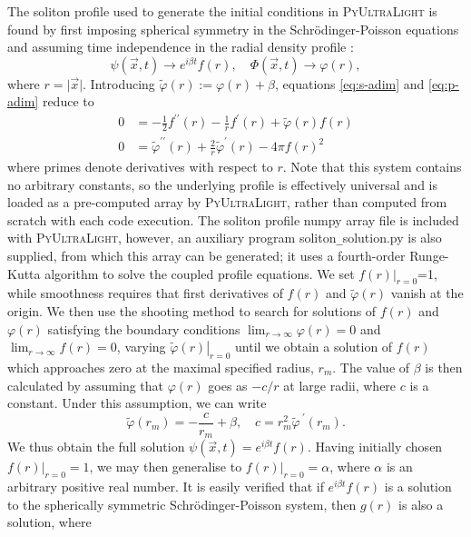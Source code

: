 \documentclass[a4paper,11pt]{article}
\newcommand{\PyUltraLight}{\textsc{PyUltraLight}\xspace}
\begin{document}
The soliton profile used to generate the initial conditions in \PyUltraLight is found by first imposing spherical symmetry in the Schr{\"o}dinger-Poisson equations and assuming time independence in the radial density profile \cite{Paredes:2015wga}:
%
\begin{equation}
    \psi(\vec{x},t)\rightarrow e^{i\beta t} f(r), \quad \Phi(\vec{x},t)\rightarrow \varphi(r),
\end{equation}
where $r=\vert\vec{x}\vert$. Introducing $\tilde{\varphi}(r):=\varphi(r)+\beta$, equations \ref{eq:s-adim} and \ref{eq:p-adim}  reduce to
\begin{align}
    0 &= -\frac{1}{2}f^{\prime\prime}(r)-\frac{1}{r}f^\prime(r)+\tilde{\varphi}(r)f(r)\label{eq:s-spherical}\\
    0 &= \tilde{\varphi}^{\prime\prime}(r)+\frac{2}{r}\tilde{\varphi}^\prime(r)-4\pi f(r)^2\label{eq:p-spherical}
\end{align}
%
where primes denote derivatives with respect to $r$. Note that this system contains no arbitrary constants, so the underlying profile is effectively universal and is loaded as a pre-computed array by \PyUltraLight, rather than computed from scratch with each code execution. The soliton profile numpy array file is included with \PyUltraLight, however, an auxiliary program {\sc soliton\texttt{\_}solution.py} is also supplied, from which this array can be generated; it uses a  fourth-order Runge-Kutta algorithm to solve the coupled profile equations. We set $\left. f(r) \right|_{r=0}$=1, while  smoothness requires that first derivatives of $f(r)$ and $\tilde{\varphi}(r)$ vanish at the origin. We then use the shooting method to search for solutions of $f(r)$ and $\varphi(r)$  satisfying the boundary conditions $\lim_{r\rightarrow\infty}\varphi(r)=0$ and $\lim_{r\rightarrow\infty}f(r)=0$, varying $\left. \tilde{\varphi}(r)\right|_{r=0}$ until we obtain a solution of $f(r)$ which approaches zero at the maximal specified radius, $r_m$. The value of $\beta$ is then calculated by assuming that $\varphi(r)$ goes as $-c/r$ at large radii, where $c$ is a constant. Under this assumption, we can write
\begin{equation}
    \tilde{\varphi}(r_m)=-\frac{c}{r_m}+\beta, \quad c=r_m^2\tilde{\varphi}^{\ \prime}(r_m).
\end{equation}
We thus obtain the full solution $\psi(\vec{x},t)=e^{i\beta t}f(r)$.
Having initially chosen $\left. f(r)\right|_{r=0}=1$, we may then generalise to $\left. f(r)\right|_{r=0}=\alpha$, where $\alpha$ is an arbitrary positive real number. It is easily verified that if $e^{i\beta t}f(r)$ is a solution to the spherically symmetric Schr{\"o}dinger-Poisson system, then $g(r)$ is also a solution, where
\end{document}
